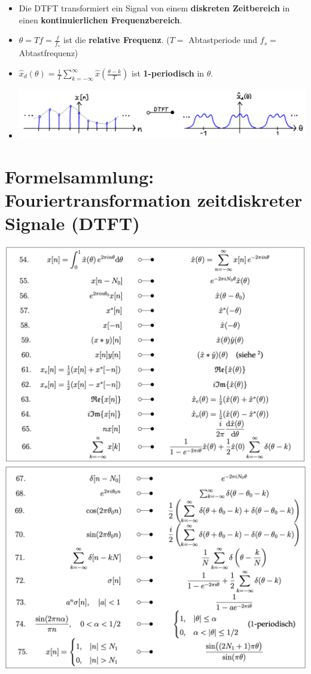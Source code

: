 \documentclass[11pt]{article}
\begin{document}
\begin{itemize}
    \item Die DTFT transformiert ein Signal von einem \textbf{diskreten Zeitbereich} in einen \textbf{kontinuierlichen Frequenzbereich}.
    \item $\theta = Tf = \frac{f}{f_s}$ ist die \textbf{relative Frequenz}. ($T=$ Abtastperiode und $f_s=$ Abtastfrequenz)
    \item $\hat{x}_d(\theta) = \displaystyle\frac{1}{T} \sum_{k=-\infty}^\infty \hat{x}\left( \frac{\theta - k}{T} \right)$ ist \textbf{1-periodisch} in $\theta$.
    \item[]  \includegraphics[width=\linewidth]{docimgs/dtft.jpg}
\end{itemize}

\vfill \null
\pagebreak

\section*{Formelsammlung: Fouriertransformation zeitdiskreter Signale (DTFT)}
\vspace*{-0.75cm}
\begin{center}
    \includegraphics[width=0.87\linewidth]{docimgs/DTFT.png}\\
    \includegraphics[width=0.867\linewidth]{docimgs/DTFT_paare.png}
\end{center}
\end{document}
